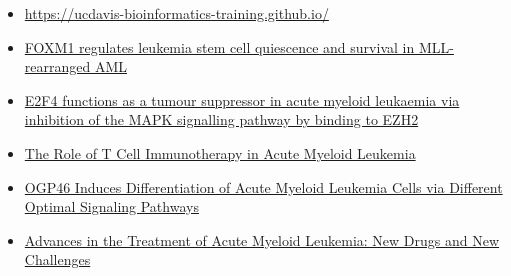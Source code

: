 \documentclass[11pt]{article}
\begin{document}
\begin{itemize}
\item
  \href{https://ucdavis-bioinformatics-training.github.io/2018-June-RNA-Seq-Workshop/thursday/DE.html}{https://ucdavis-bioinformatics-training.github.io/}
\item
  \href{https://www.nature.com/articles/s41467-020-14590-9}{FOXM1
  regulates leukemia stem cell quiescence and survival in MLL-rearranged
  AML}
\item
  \href{https://pubmed.ncbi.nlm.nih.gov/31943751/}{E2F4 functions as a
  tumour suppressor in acute myeloid leukaemia via inhibition of the
  MAPK signalling pathway by binding to EZH2}
\item
  \href{https://www.ncbi.nlm.nih.gov/pmc/articles/PMC8699747/}{The Role
  of T Cell Immunotherapy in Acute Myeloid Leukemia}
\item
  \href{https://www.frontiersin.org/articles/10.3389/fcell.2021.652972/full}{OGP46
  Induces Differentiation of Acute Myeloid Leukemia Cells via Different
  Optimal Signaling Pathways}
\item
  \href{https://aacrjournals.org/cancerdiscovery/article/10/4/506/2495/Advances-in-the-Treatment-of-Acute-Myeloid}{Advances
  in the Treatment of Acute Myeloid Leukemia: New Drugs and New
  Challenges}
\end{itemize}


    
    
    
\end{document}
